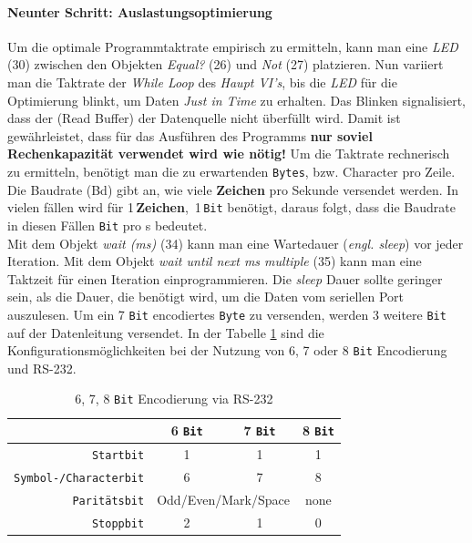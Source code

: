 \paragraph{Neunter Schritt: Auslastungsoptimierung} Um die optimale Programmtaktrate empirisch zu ermitteln, kann man eine \textit{LED} (30) zwischen den Objekten \textit{Equal?} (26) und \textit{Not} (27) platzieren. Nun variiert man die Taktrate der \textit{While Loop} des  \textit{Haupt VI's}, bis die \textit{LED} für die Optimierung blinkt, um Daten \textit{Just in Time} zu erhalten. Das Blinken signalisiert, dass der (Read Buffer) der Datenquelle nicht überfüllt wird. Damit ist gewährleistet, dass für das Ausführen des Programms \textbf{ nur soviel Rechenkapazität verwendet wird wie nötig!} Um die Taktrate rechnerisch zu ermitteln, benötigt man die zu erwartenden \texttt{Bytes}, bzw. Character pro Zeile. Die Baudrate (Bd) gibt an, wie viele \textbf{Zeichen} pro Sekunde versendet werden. In vielen fällen wird für 1\,\textbf{Zeichen},
\,1\,\texttt{Bit} benötigt, daraus folgt, dass die Baudrate in diesen Fällen \texttt{Bit} pro s bedeutet.\\

Mit dem Objekt \textit{wait (ms)} (34) kann man eine Wartedauer (\textit{engl. sleep}) vor jeder Iteration. Mit dem Objekt \textit{wait until next ms multiple} (35) kann man eine Taktzeit für einen Iteration einprogrammieren. Die \textit{sleep} Dauer sollte geringer sein, als die Dauer, die benötigt wird, um die Daten vom seriellen Port auszulesen. Um ein 7  \texttt{Bit} encodiertes \texttt{Byte} zu versenden, werden 3 weitere \texttt{Bit} auf der Datenleitung versendet. In der Tabelle \ref{tab:678bit} sind die Konfigurationsmöglichkeiten bei der Nutzung von 6, 7 oder 8 \texttt{Bit} Encodierung  und RS-232.

\begin{table}[hpt!] %
\caption{6, 7, 8 \texttt{Bit} Encodierung via RS-232}
\begin{center}
\begin{tabular}{|r|c|c|c|}
\cline{2-4}
\multicolumn{1}{c|}{} &	6 \texttt{Bit} 		& 7 \texttt{Bit} 		& 8 \texttt{Bit}\\
\hline
 \texttt{Startbit} 				& 1				 & 1 			& 1\\ \hline
 \texttt{Symbol-/Characterbit} & 6 			& 7 			& 8\\ \hline
 \texttt{Paritätsbit} & \multicolumn{2}{c|}{\hspace{3pt} Odd/Even/Mark/Space \hspace{3pt}} & none  \\ \hline
\texttt{Stoppbit}	& 	2 &	1& 0\\
\hline
\end{tabular}
\end{center}
\label{tab:678bit}
\end{table}




